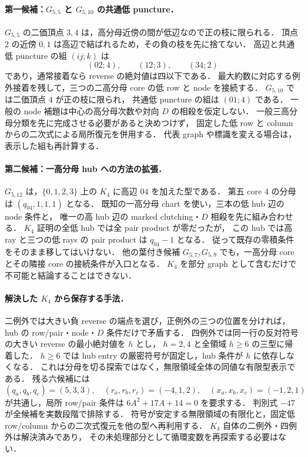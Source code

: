 \paragraph{第一候補：$G_{5,5}$ と $G_{5,10}$ の共通低 puncture．}
$G_{5,5}$ の二価頂点 $3,4$ は，高分母近傍の間が低辺なので正の枝に限られる．
頂点 $2$ の近傍 $0,1$ は高辺で結ばれるため，その負の枝を先に捨てない．
高辺と共通低 puncture の組 $(ij;k)$ は
\[
 (02;4),\qquad(12;3),\qquad(34;2)
\]
であり，通常接着なら reverse の絶対値は四以下である．
最大約数に対応する例外接着を残して，三つの二高分母 core の低 row と node を接続する．
$G_{5,10}$ では二価頂点 $4$ が正の枝に限られ，
共通低 puncture の組は $(01;4)$ である．
一般の node 補題は中心の高分母次数や対向 $D$ の相殺を仮定しない．
一般三高分母分類を先に完成させる必要があると決めつけず，
固定した低 row と column からの二次式による局所復元を併用する．
代表 graph や標識を変える場合は，表示した組も再計算する．

\paragraph{第二候補：一高分母 hub への方法の拡張．}
$G_{5,12}$ は，$\{0,1,2,3\}$ 上の $K_4$ に高辺 $04$ を加えた型である．
第五 core $4$ の分母は $(q_{04},1,1,1)$ となる．
既知の一高分母 chart を使い，三本の低 hub 辺の node 条件と，
唯一の高 hub 辺の marked clutching・$D$ 相殺を先に組み合わせる．
$K_4$ 証明の全低 hub では全 pair product が零だったが，
この hub では高 ray と三つの低 rays の pair product は $q_{04}-1$ となる．
従って既存の零積条件をそのまま移してはいけない．
他の葉付き候補 $G_{5,7},G_{5,9}$ でも，一高分母 core とその隣接 core の接続条件が入口となる．
$K_4$ を部分 graph として含むだけで不可能と結論することはできない．

\paragraph{解決した $K_4$ から保存する手法．}
二例外では大きい負 reverse の端点を選び，正例外の三つの位置を分ければ，
hub の row/pair・node・$D$ 条件だけで矛盾する．
四例外では同一行の反対符号の大きい reverse の最小絶対値を $h$ とし，
$h=2,4$ と全領域 $h\ge6$ の三型に帰着した．
$h\ge6$ では hub entry の厳密符号が固定し，hub 条件が $h$ に依存しなくなる．
これは分母を切る探索ではなく，無限領域全体の同値な有限型表示である．
残る六候補には
\[
 (q_a,q_b,q_c)=(5,3,3),\quad
 (r_a,r_b,r_c)=(-4,1,2),\quad
 (x_a,x_b,x_c)=(-1,2,1)
\]
が共通し，局所 row/pair 条件は $6A^2+17A+14=0$ を要求する．
判別式 $-47$ が全候補を実数段階で排除する．
符号が安定する無限領域の有限化と，固定低 row/column からの二次式復元を他の型へ再利用する．
$K_4$ 自体の二例外・四例外は解決済みであり，
その未処理部分として循環変数を再探索する必要はない．

